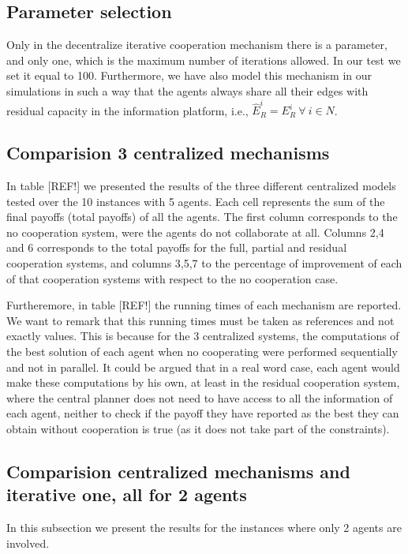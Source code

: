 \documentclass[authoryear]{elsarticle}
\begin{document}
\subsection{Parameter selection}

Only in the decentralize iterative cooperation mechanism there is a parameter, and only one, which is the maximum number of iterations allowed. In our test we set it equal to 100. Furthermore, we have also model this mechanism in our simulations in such a way that the agents always share all their edges with residual capacity in the information platform, i.e., $\widehat{E}_R^i=E_R^i\ \forall\ i\in N$.

\subsection{Comparision 3 centralized mechanisms}

In table [REF!] we presented the results of the three different centralized models tested over the 10 instances with 5 agents. Each cell represents the sum of the final payoffs (total payoffs) of all the agents. The first column corresponds to the no cooperation system, were the agents do not collaborate at all. Columns 2,4 and 6 corresponds to the total payoffs for the full, partial and residual cooperation systems, and columns 3,5,7 to the percentage of improvement of each of that cooperation systems with respect to the no cooperation case.

Furtheremore, in table [REF!] the running times of each mechanism are reported. We want to remark that this running times must be taken as references and not exactly values. This is because for the 3 centralized systems, the computations of the best solution of each agent when no cooperating were performed sequentially and not in parallel. It could be argued that in a real word case, each agent would make these computations by his own, at least in the residual cooperation system, where the central planner does not need to have access to all the information of each agent, neither to check if the payoff they have reported as the best they can obtain without cooperation is true (as it does not take part of the constraints).

\subsection{Comparision centralized mechanisms and iterative one, all for 2 agents}
 

In this subsection we present the results for the instances where only 2 agents are involved. 
\end{document}
